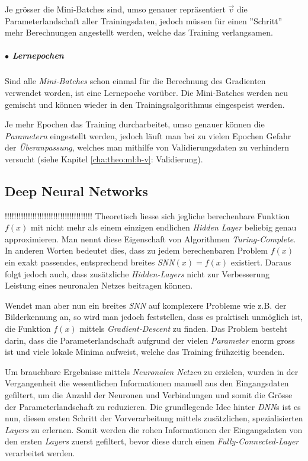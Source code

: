 Je grösser die Mini-Batches sind, umso genauer repräsentiert $\vec{v}$ die Parameterlandschaft aller Trainingsdaten, jedoch müssen für einen ''Schritt'' mehr Berechnungen angestellt werden, welche das Training verlangsamen.


\subparagraph{$\bullet$ Lernepochen} Sind alle \textit{Mini-Batches} schon einmal für die Berechnung des Gradienten verwendet worden, ist eine Lernepoche vorüber. Die Mini-Batches werden neu gemischt und können wieder in den Trainingsalgorithmus eingespeist werden.

Je mehr Epochen das Training durcharbeitet, umso genauer können die \textit{Parametern} eingestellt werden, jedoch läuft man bei zu vielen Epochen Gefahr der \textit{Überanpassung}, welches man mithilfe von Validierungsdaten zu verhindern versucht (siehe Kapitel \ref{cha:theo:ml:b-v}: Validierung).


\subsection[DNNs]{Deep Neural Networks}\label{cha:theo:dl}!!!!!!!!!!!!!!!!!!!!!!!!!!!!!!!!!!!!!!
Theoretisch liesse sich jegliche berechenbare Funktion $f(x)$ mit nicht mehr als einem einzigen endlichen \textit{Hidden Layer} beliebig genau approximieren. Man nennt diese Eigenschaft von Algorithmen \textit{Turing-Complete}. In anderen Worten bedeutet dies, dass zu jedem berechenbaren Problem $f(x)$ ein exakt passendes, entsprechend breites \textit{SNN}$(x) = f(x)$ existiert\cite{hornik}. Daraus folgt jedoch auch, dass zusätzliche \textit{Hidden-Layers} nicht zur Verbesserung Leistung eines neuronalen Netzes beitragen können\footnotemark.\\


Wendet man aber nun ein breites \textit{SNN} auf komplexere Probleme wie z.B. der Bilderkennung an, so wird man jedoch feststellen, dass es praktisch unmöglich ist, die Funktion $f(x)$ mittels \textit{Gradient-Descent} zu finden. Das Problem besteht darin, dass die Parameterlandschaft aufgrund der vielen \textit{Parameter} enorm gross ist und viele lokale Minima aufweist, welche das Training frühzeitig beenden.

Um brauchbare Ergebnisse mittels \textit{Neuronalen Netzen} zu erzielen, wurden in der Vergangenheit die wesentlichen Informationen manuell aus den Eingangsdaten gefiltert, um die Anzahl der Neuronen und Verbindungen und somit die Grösse der Parameterlandschaft zu reduzieren. Die grundlegende Idee hinter \textit{DNN}s ist es nun, diesen ersten Schritt der Vorverarbeitung mittels zusätzlichen, spezialisierten \textit{Layers} zu erlernen. Somit werden die rohen Informationen der Eingangsdaten von den ersten \textit{Layers} zuerst gefiltert, bevor diese durch einen \textit{Fully-Connected-Layer} verarbeitet werden.\\

